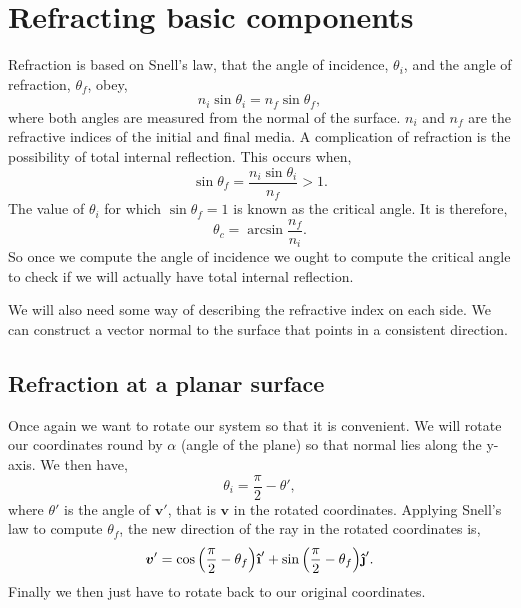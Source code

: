 \documentclass{article}
\let\vec \bm
\newcommand{\uveci}{{\bm{\hat{\textnormal{\bfseries\i}}}}}
\newcommand{\uvecj}{{\bm{\hat{\textnormal{\bfseries\j}}}}}
\begin{document}
\section{Refracting basic components}
Refraction is based on Snell's law, that the angle of incidence, $\theta_i$, and the angle of refraction, $\theta_f$, obey,
\begin{equation}
    n_i \sin \theta_i 
    =
    n_f \sin \theta_f,
\end{equation}
where both angles are measured from the normal of the surface. $n_i$ and $n_f$ are the refractive indices of the initial and final media. A complication of refraction is the possibility of total internal reflection. This occurs when,
\begin{equation}
    \sin \theta_f 
    =
    \frac{n_i \sin \theta_i}{n_f} > 1.
\end{equation}
The value of $\theta_i$ for which $\sin{\theta_f} = 1$ is known as the critical angle. It is therefore,
\begin{equation}
    \theta_c
    =
    \arcsin{\frac{n_f}{n_i}}.
\end{equation}
So once we compute the angle of incidence we ought to compute the critical angle to check if we will actually have total internal reflection.

We will also need some way of describing the refractive index on each side. We can construct a vector normal to the surface that points in a consistent direction.

\subsection{Refraction at a planar surface}
Once again we want to rotate our system so that it is convenient. We will rotate our coordinates round by $\alpha$ (angle of the plane) so that normal lies along the y-axis. We then have,
\begin{equation}
    \theta_i 
    =
    \frac{\pi}{2} - \theta',
\end{equation}
where $\theta'$ is the angle of $\vec{v}'$, that is $\vec v$ in the rotated coordinates. Applying Snell's law to compute $\theta_f$, the new direction of the ray in the rotated coordinates is,
\begin{equation}
    \vec{v}'
    = 
    \cos{
    \left(
        \frac{\pi}{2} - \theta_f
    \right)
    } \uveci'
    +
    \sin{
    \left(
        \frac{\pi}{2} - \theta_f
    \right)
    } \uvecj'.
\end{equation}
Finally we then just have to rotate back to our original coordinates. 
\end{document}
